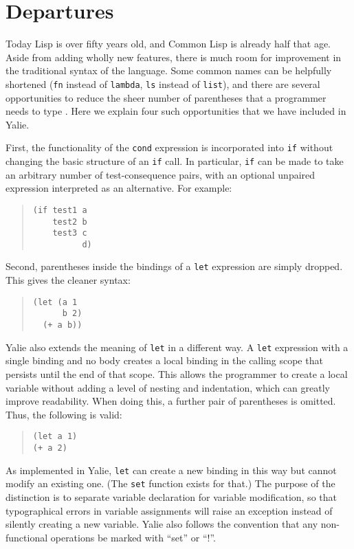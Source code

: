 \documentclass[twocolumn]{article}
\begin{document}
\section*{Departures}
Today Lisp is over fifty years old, and Common Lisp is already half
that age. Aside from adding wholly new features, there is much room
for improvement in the traditional syntax of the language. Some common
names can be helpfully shortened (\texttt{fn} instead of
\texttt{lambda}, \texttt{ls} instead of \texttt{list}), and there are
several opportunities to reduce the sheer number of parentheses that a
programmer needs to type \cite{Graham}. Here we explain four such
opportunities that we have included in Yalie.

First, the functionality of the \texttt{cond} expression is
incorporated into \texttt{if} without changing the basic structure of
an \texttt{if} call. In particular, \texttt{if} can be made to take an
arbitrary number of test-consequence pairs, with an optional unpaired
expression interpreted as an alternative. For example:
\begin{quote}
\begin{verbatim}
(if test1 a
    test2 b
    test3 c
          d)
\end{verbatim}
\end{quote}

Second, parentheses inside the bindings of a \texttt{let} expression
are simply dropped. This gives the cleaner syntax:
\begin{quote}
\begin{verbatim}
(let (a 1
      b 2)
  (+ a b))
\end{verbatim}
\end{quote}
Yalie also extends the meaning of \texttt{let} in a different way. A
\texttt{let} expression with a single binding and no body creates a
local binding in the calling scope that persists until the end of that
scope. This allows the programmer to create a local variable without
adding a level of nesting and indentation, which can greatly improve
readability. When doing this, a further pair of parentheses is
omitted. Thus, the following is valid:
\begin{quote}
\begin{verbatim}
(let a 1)
(+ a 2)
\end{verbatim}
\end{quote}
As implemented in Yalie, \texttt{let} can create a new binding in this
way but cannot modify an existing one. (The \texttt{set} function
exists for that.) The purpose of the distinction is to separate
variable declaration for variable modification, so that typographical
errors in variable assignments will raise an exception instead of
silently creating a new variable. Yalie also follows the convention
that any non-functional operations be marked with ``set'' or ``!''.
\end{document}
